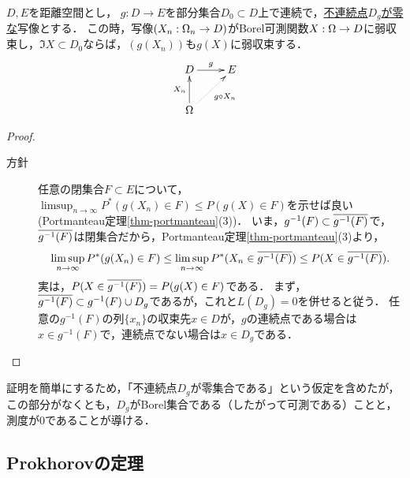 \documentclass[uplatex,dvipdfmx]{jsreport}
\begin{document}
\begin{theorem}\label{thm-continuous-map-theorem}
    $D,E$を距離空間とし，
    $g:D\to E$を部分集合$D_0\subset D$上で連続で，\underline{不連続点$D_g$が零な}写像とする．
    この時，写像$(X_n:\Omega_n\to D)$がBorel可測関数$X:\Omega\to D$に弱収束し，$\Im X\subset D_0$ならば，$(g(X_n))$も$g(X)$に弱収束する．
    \[\xymatrix{
        D\ar[r]^-g&E\\
        \Om\ar[u]^-{X_n}\ar@{.>}[ur]_-{g\circ X_n}
    }\]
\end{theorem}
\begin{proof}\mbox{}
    \begin{description}
        \item[方針] 任意の閉集合$F\subset E$について，$\limsup_{n\to\infty}P^*(g(X_n)\in F)\le P(g(X)\in F)$を示せば良い(Portmanteau定理\ref{thm-portmanteau}(3))．
        いま，$g^{-1}(F)\subset\overline{g^{-1}(F)}$で，$\overline{g^{-1}(F)}$は閉集合だから，Portmanteau定理\ref{thm-portmanteau}(3)より，
        \[\limsup_{n\to\infty}P^*(g(X_n)\in F)\le\limsup_{n\to\infty}P^*(X_n\in\overline{g^{-1}(F)})\le P(X\in\overline{g^{-1}(F)}).\]
        実は，$P(X\in\overline{g^{-1}(F)})=P(g(X)\in F)$である．
        まず，$\overline{g^{-1}(F)}\subset g^{-1}(F)\cup D_g$であるが，これと$L(D_g)=0$を併せると従う．
        任意の$g^{-1}(F)$の列$\{x_n\}$の収束先$x\in D$が，$g$の連続点である場合は$x\in g^{-1}(F)$で，連続点でない場合は$x\in D_g$である．
    \end{description}
\end{proof}
\begin{remark}
    証明を簡単にするため，「不連続点$D_g$が零集合である」という仮定を含めたが，
    この部分がなくとも，$D_g$がBorel集合である（したがって可測である）ことと，測度が$0$であることが導ける．
\end{remark}

\subsection{Prokhorovの定理}
\end{document}
